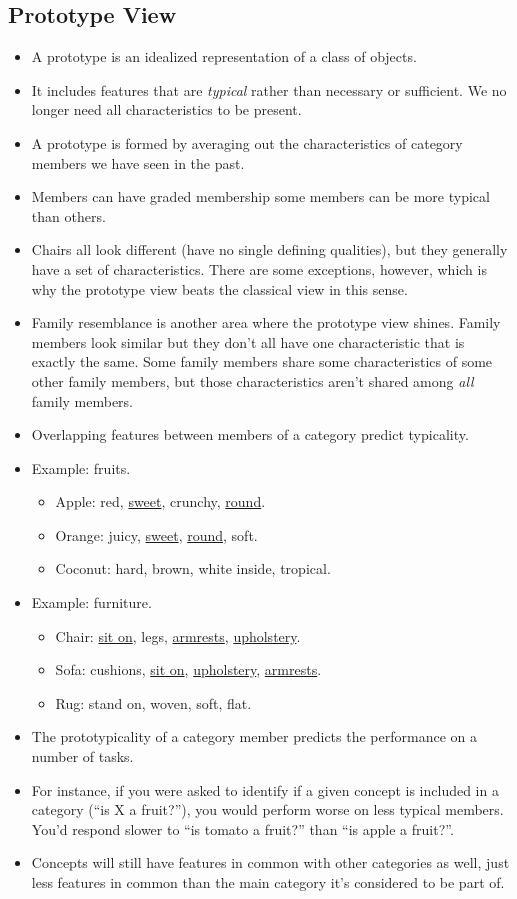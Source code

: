 \documentclass[]{article}
\begin{document}
		\subsection{Prototype View}
			\begin{itemize}
				\item A prototype is an idealized representation of a class of objects.
				\item It includes features that are \emph{typical} rather than necessary or sufficient. We no longer need all characteristics to be present.
				\item A prototype is formed by averaging out the characteristics of category members we have seen in the past.
				\item Members can have graded membership \textendash{} some members can be more typical than others.
				\item Chairs all look different (have no single defining qualities), but they generally have a set of characteristics. There are some exceptions, however, which is why the prototype view beats the classical view in this sense.
				\item Family resemblance is another area where the prototype view shines. Family members look similar but they don't all have one characteristic that is exactly the same. Some family members share some characteristics of some other family members, but those characteristics aren't shared among \emph{all} family members.
				\item Overlapping features between members of a category predict typicality.
				\item Example: fruits.
					\begin{itemize}
						\item Apple: red, \underline{sweet}, crunchy, \underline{round}.
						\item Orange: juicy, \underline{sweet}, \underline{round}, soft.
						\item Coconut: hard, brown, white inside, tropical.
					\end{itemize}
				\item Example: furniture.
					\begin{itemize}
						\item Chair: \underline{sit on}, legs, \underline{armrests}, \underline{upholstery}.
						\item Sofa: cushions, \underline{sit on}, \underline{upholstery}, \underline{armrests}.
						\item Rug: stand on, woven, soft, flat.
					\end{itemize}
				\item The prototypicality of a category member predicts the performance on a number of tasks.
				\item For instance, if you were asked to identify if a given concept is included in a category (``is X a fruit?''), you would perform worse on less typical members. You'd respond slower to ``is tomato a fruit?'' than ``is apple a fruit?''.
				\item Concepts will still have features in common with other categories as well, just less features in common than the main category it's considered to be part of.
			\end{itemize}
\end{document}
